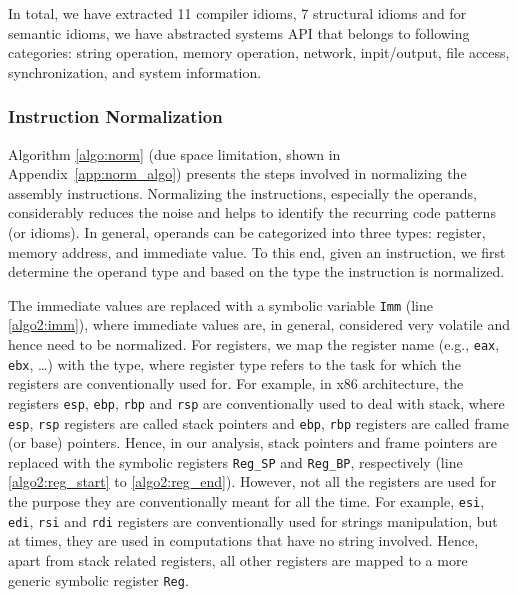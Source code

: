 In total, we have extracted 11 compiler idioms, 7 structural idioms and for semantic idioms, we have abstracted systems API that belongs to following categories: string operation, memory operation, network, inpit/output, file access, synchronization, and system information.


		
\subsubsection{Instruction Normalization} \label{subsubsec:func_norm}
Algorithm \ref{algo:norm} (due space limitation, shown in Appendix~\ref{app:norm_algo}) presents the steps involved in normalizing the assembly instructions. %
 Normalizing the instructions, especially the operands, considerably reduces the noise and helps to identify the recurring code patterns (or idioms). In general, operands can be categorized into three types: register, memory address, and immediate value. To this end, given an instruction, we first determine the operand type and based on the type the instruction is normalized.

The immediate values are replaced with a symbolic variable \texttt{Imm} (line \ref{algo2:imm}), where immediate values are, in general, considered very volatile and hence need to be normalized. For registers, we map the register name (e.g., \texttt{eax}, \texttt{ebx}, \ldots) with the type, where register type refers to the task for which the registers are conventionally used for.
For example, in x86 architecture, the registers \texttt{esp}, \texttt{ebp}, \texttt{rbp} and \texttt{rsp} are conventionally used to deal with stack, where \texttt{esp}, \texttt{rsp} registers are called stack pointers and \texttt{ebp}, \texttt{rbp} registers are called frame (or base) pointers. Hence, in our analysis, stack pointers and frame pointers are replaced with the symbolic registers \texttt{Reg\_SP} and \texttt{Reg\_BP}, respectively (line \ref{algo2:reg_start} to \ref{algo2:reg_end}). However, not all the registers are used for the purpose they are conventionally meant for all the time. For example, \texttt{esi}, \texttt{edi}, \texttt{rsi} and \texttt{rdi} registers are conventionally used for strings manipulation, but at times, they are used in computations that have no string involved. Hence, apart from stack related registers, all other registers are mapped to a more generic symbolic register \texttt{Reg}.


